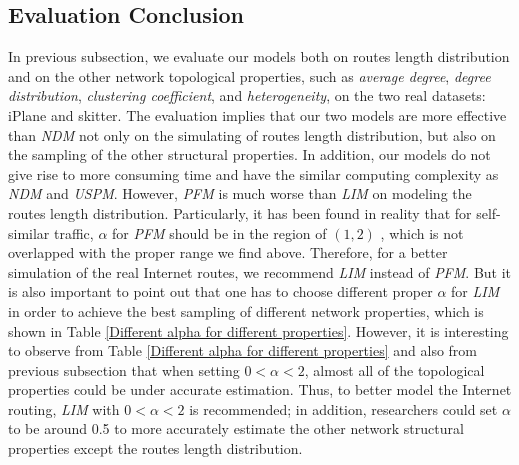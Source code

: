\documentclass[a4paper]{llncs}
\begin{document}
\subsection{Evaluation Conclusion}
In previous subsection, we evaluate our models both on routes length
distribution and on the other network topological properties, such as {\it
average degree}, {\it degree distribution}, {\it clustering
coefficient}, and {\it heterogeneity}, on the two real datasets: iPlane
and skitter. The evaluation implies that our two models are more effective than \textit{NDM} not only on the simulating of routes length distribution, but also on the sampling of the other structural properties. In addition, our models
do not give rise to more consuming time and have the similar
computing complexity as \textit{NDM} and \textit{USPM}. However,
\textit{PFM} is much worse than \textit{LIM} on modeling the routes
length distribution. Particularly, it has been found in reality that for self-similar traffic,
$\alpha$ for \textit{PFM} should be in the region of $(1,2)$
\cite{ParetoModulatedModel}, which is not overlapped with the proper
range we find above. Therefore, for a better simulation of the real
Internet routes, we recommend \textit{LIM} instead of \textit{PFM}.
But it is also important to point out that one has to
choose different proper $\alpha$ for \textit{LIM} in order to
achieve the best sampling of different network properties, which is shown in
Table \ref{Different alpha for different properties}. However,
it is interesting to observe from Table \ref{Different alpha for
different properties} and also from previous subsection that when
setting $0 < \alpha < 2$, almost all of the topological properties could be under
accurate estimation. Thus, to better model the Internet routing, \textit{LIM} with $0 < \alpha < 2$ is recommended; in
addition, researchers could set $\alpha$ to be around 0.5 to more
accurately estimate the other network structural properties except the routes
length distribution.
\end{document}
